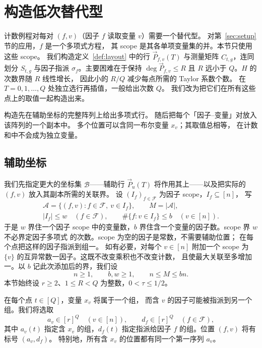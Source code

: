 \section{构造低次替代型}\label{sec:construction}
计数例程对每对 $(f,v)$（因子 $f$ 读取变量 $v$）需要一个替代型。
对第~\ref{sec:setup} 节的应用，$f$ 是一个多项式方程，
其 scope 是其各单项变量集的并。本节只使用这些 scope。
我们构造定义~\ref{def:layout} 中的行 $\vec{P}_{f,v}(T)$
与测量矩阵 $C_{t,g}$，连同划分 $S_{t,g}$ 与因子指派
$\sigma_f$。主要困难在于保持 $\deg \vec{P}_{f,v}\le R$
且 $R$ 远小于 $Q$。$H$ 的次数界随 $R$ 线性增长，
因此小的 $R/Q$ 减少每点所需的 Taylor 系数个数。
在 $T=0,1,\ldots,Q$ 处独立选行再插值，一般给出次数 $Q$。
我们改为把它们在所有这些点上的取值一起构造出来。

构造先在辅助坐标的完整阵列上给出多项式行。
随后把每个「因子--变量」对放入该阵列的一个副本中。
多个位置可以含同一布尔变量 $x_v$；其取值总相等，
在计数和中不会成为独立变量。

\subsection{辅助坐标}\label{subsec:incidence-layout}
我们先指定更大的坐标集 $\mathcal B$——辅助行
$\vec{P}_u(T)$ 将作用其上——以及把实际的 $(f,v)$
放入其副本所需的关联界。
设 $(I_f)_{f\in\mathcal F}$ 为因子 scope，$I_f\subseteq[n]$，
写
\begin{equation}\label{eq:factor-incidences}
 \begin{gathered}
 \mathcal A=\{(f,v):f\in\mathcal F,\ v\in I_f\},\qquad M=|\mathcal A|,\\
 |I_f|\le w\quad(f\in\mathcal F),\qquad
 \#\{f:v\in I_f\}\le b\quad(v\in[n]).
 \end{gathered}
\end{equation}
于是 $w$ 界住一个因子 scope 中的变量数，$b$
界住含一个变量的因子数。scope 界 $w$ 不必界定因子多项式
的次数。scope 为空的因子是常数，不需要辅助位置；
在每个点把这样的因子指派到组一。
如有必要，对每个 $v\in[n]$ 附加一个 scope 为 $\{v\}$
的互异常数一因子。这既不改变乘积也不改变计数，
且使最大关联至多增加一。以 $b$ 记此次添加后的界，我们设
\[
 n\ge1,\qquad b,w\ge1,\qquad n\le M\le bn.
\]
本节始终设 $r\ge2$、$1\le R<Q$ 为整数，$0<\tau\le1/2$。

在每个点 $t\in[Q]$，变量 $x_v$ 将属于一个组，
而含 $v$ 的因子可能被指派到另一个组。我们将选取
\[
 a_v\in[r]^Q\quad(v\in[n]),\qquad
 d_f\in[r]^Q\quad(f\in\mathcal F),
\]
其中 $a_v(t)$ 指定含 $x_v$ 的组，$d_f(t)$ 指定指派给因子
$f$ 的组。位置 $(f,v)$ 将有标号 $(a_v,d_f)$。
特别地，所有含 $x_v$ 的位置都有同一个第一序列 $a_v$。

